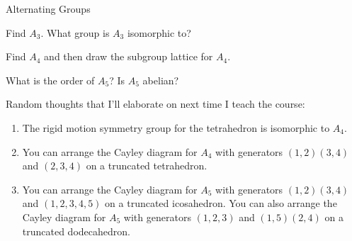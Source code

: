 \begin{section}{Alternating Groups}
\begin{exercise}
Find \(A_3\).  What group is \(A_3\) isomorphic to?
\end{exercise}

\begin{exercise}
Find \(A_4\) and then draw the subgroup lattice for \(A_4\).
\end{exercise}

\begin{exercise}
What is the order of \(A_5\)?  Is \(A_5\) abelian?
\end{exercise}

Random thoughts that I'll elaborate on next time I teach the course:
\begin{enumerate}
\item The rigid motion symmetry group for the tetrahedron is isomorphic to \(A_4\).
\item You can arrange the Cayley diagram for \(A_4\) with generators \((1,2)(3,4)\) and \((2,3,4)\) on a truncated tetrahedron. 
\item You can arrange the Cayley diagram for \(A_5\) with generators \((1,2)(3,4)\) and \((1,2,3,4,5)\) on a truncated icosahedron.  You can also arrange the Cayley diagram for \(A_5\) with generators \((1,2,3)\) and \((1,5)(2,4)\) on a truncated dodecahedron. 
\end{enumerate}

\end{section}
